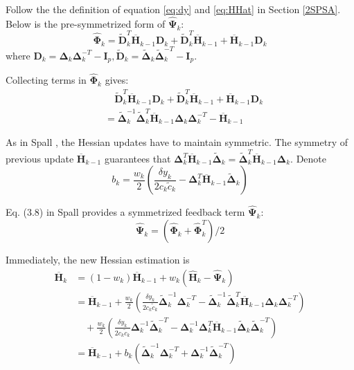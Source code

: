 \documentclass[conference]{IEEEtran}
\newcommand{\bD}{\bm{D}}
\newcommand{\bI}{\bm{I}}
\newcommand{\bDelta}{\bm{\Delta}}
\newcommand{\oH}{\bm{\overline{H}}}
\newcommand{\hH}{\bm{\hat{H}}}
\newcommand{\hPsi}{\bm{\hat{\Psi}}}
\newcommand{\hPhi}{\bm{\hat{\Phi}}}
\newcommand{\tDelta}{\bm{\tilde{\Delta}}}
\newcommand{\tD}{\bm{\tilde{D}}}
\begin{document}
Follow the the definition of equation \ref{eq:dy} and \ref{eq:HHat} in Section \ref{2SPSA}. Below is the pre-symmetrized form of $ \hPsi_k $:
\begin{equation}
	\hPhi_k=\tD_k^T\oH_{k-1}\bD_k+\tD_k^T\oH_{k-1}+\oH_{k-1}\bD_k
\end{equation}
where $ \bD_k=\bDelta_k\bDelta_k^{-T}-\bI_p, \tD_k=\tDelta_k\tDelta_k^{-T}-\bI_p $.

Collecting terms in $\hPhi_k$ gives:
\begin{align*}
&\quad\tD_k^T\oH_{k-1}\bD_k+\tD_k^T\oH_{k-1}+\oH_{k-1}\bD_k\\
&=\tDelta_k^{-1}\tDelta_k^{T}\oH_{k-1}\bDelta_k\bDelta_k^{-T}-\oH_{k-1}
\end{align*}

As in Spall \cite{Spall2009}, the Hessian updates have to maintain symmetric. The symmetry of previous update $ \oH_{k-1}$ guarantees that $\bDelta_k^{T}\oH_{k-1}\tDelta_k=\tDelta_k^{T}\oH_{k-1}\bDelta_k$. Denote
\begin{equation}
b_k=\frac{w_k}{2}(\frac{\delta y_k}{2c_k\tilde{c}_k}-\bDelta_k^{T}\oH_{k-1}\tDelta_k)
\end{equation}

Eq. (3.8) in Spall \cite{Spall2009} provides a symmetrized feedback term $ \hPsi_k $:
\begin{equation} \label{eq:PsiHat}
\hPsi_k =(\hPhi_k+\hPhi_k^T)/2
\end{equation}

Immediately, the new Hessian estimation is
\begin{align*}
\oH_k&=(1-w_k)\oH_{k-1}+w_k(\hH_k-\hPsi_k)\\
&=\oH_{k-1}+\frac{w_k}{2}(\frac{\delta y_k}{2c_k\tilde{c}_k}\tDelta_k^{-1}\bDelta_k^{-T}-\tDelta_k^{-1}\tDelta_k^{T}\oH_{k-1}\bDelta_k\bDelta_k^{-T})\\
&\quad +\frac{w_k}{2}(\frac{\delta y_k}{2c_k\tilde{c}_k}\bDelta_k^{-1}\tDelta_k^{-T}-\bDelta_k^{-1}\bDelta_k^{T}\oH_{k-1}\tDelta_k\tDelta_k^{-T})\\
&=\oH_{k-1}+b_k(\tDelta_k^{-1}\bDelta_k^{-T}+\bDelta_k^{-1}\tDelta_k^{-T})
\end{align*}
\end{document}
